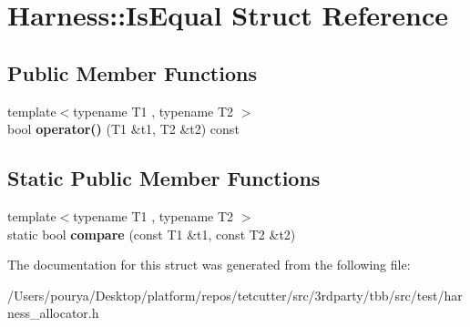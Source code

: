 \hypertarget{structHarness_1_1IsEqual}{}\section{Harness\+:\+:Is\+Equal Struct Reference}
\label{structHarness_1_1IsEqual}
\subsection*{Public Member Functions}
\begin{DoxyCompactItemize}
\item 
\hypertarget{structHarness_1_1IsEqual_a8bef37d3e70c427d00e7c9e52175fe37}{}{\footnotesize template$<$typename T1 , typename T2 $>$ }\\bool {\bfseries operator()} (T1 \&t1, T2 \&t2) const \label{structHarness_1_1IsEqual_a8bef37d3e70c427d00e7c9e52175fe37}

\end{DoxyCompactItemize}
\subsection*{Static Public Member Functions}
\begin{DoxyCompactItemize}
\item 
\hypertarget{structHarness_1_1IsEqual_a08a3838f200285c4a7062274563f868f}{}{\footnotesize template$<$typename T1 , typename T2 $>$ }\\static bool {\bfseries compare} (const T1 \&t1, const T2 \&t2)\label{structHarness_1_1IsEqual_a08a3838f200285c4a7062274563f868f}

\end{DoxyCompactItemize}


The documentation for this struct was generated from the following file\+:\begin{DoxyCompactItemize}
\item 
/\+Users/pourya/\+Desktop/platform/repos/tetcutter/src/3rdparty/tbb/src/test/harness\+\_\+allocator.\+h\end{DoxyCompactItemize}
